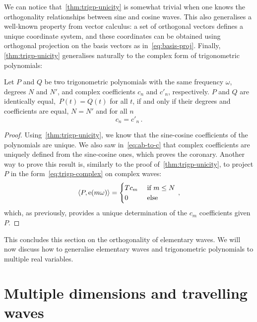 We can notice that~\cref{thm:trigp-unicity} is somewhat trivial when one knows the
orthogonality relationships between sine and cosine waves. This also generalises a
well-known property from vector calculus: a set of orthogonal vectors defines a unique
coordinate system, and these coordinates can be obtained using orthogonal projection on
the basis vectors as in~\cref{eq:basis-proj}. Finally, \cref{thm:trigp-unicity}
generalises naturally to the complex form of trigonometric polynomials:
\begin{corollary}
  Let $P$ and $Q$ be two trigonometric polynomials with the same frequency $\omega$,
  degrees $N$ and $N'$, and complex coefficients $c_n$ and $c'_n$, respectively. $P$ and
  $Q$ are identically equal,~\ie $P(t)=Q(t)$ for all $t$, if and only if their degrees and
  coefficients are equal, \ie $N=N'$ and for all $n$
  \begin{equation}
    c_n=c'_n\,.
  \end{equation}
\end{corollary}
\begin{proof}
  Using~\cref{thm:trigp-unicity}, we know that the sine-cosine coefficients of the
  polynomials are unique. We also saw in~\cref{eq:ab-to-c} that complex coefficients are
  uniquely defined from the sine-cosine ones, which proves the coronary. Another way to
  prove this result is, similarly to the proof of~\cref{thm:trigp-unicity}, to project $P$
  in the form~\cref{eq:trigp-complex} on complex waves:
  \begin{equation}
    \braket{P,\mathrm{e}(m\omega)}=
    \begin{cases}
      T c_m&~\text{if}~m\leq N\\
      0&~\text{else}
    \end{cases}\,,
  \end{equation}
  which, as previously, provides a unique determination of the $c_m$ coefficients given
  $P$.
\end{proof}
This concludes this section on the orthogonality of elementary waves. We will now discuss
how to generalise elementary waves and trigonometric polynomials to multiple real
variables.
\section{Multiple dimensions and travelling waves}
